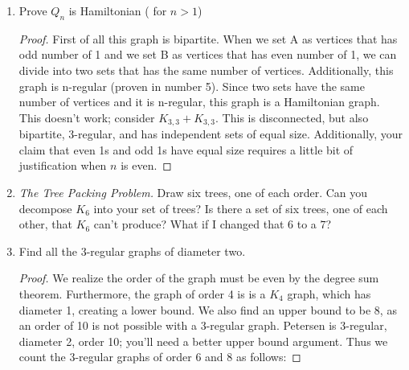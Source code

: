 \begin{enumerate}[leftmargin=*]
\begin{enumerate}
    \item Prove $Q_n$ is regular.
    \begin{proof}
    For each vertices, we can relate with numbers by changing digits 0 to 1 or 1 to 0. Since we can change n tuples, the degree of each vertices are n which makes this graph n-regular. \color{red} Great! \color{black}
\end{proof}
    \item Prove $Q_n$ is bipartite. 
    \begin{proof}
    When we set A as vertices that has odd number of 1 and we set B as vertices that has even number of 1, we can have two set in the same number of vertices and see that this graph is bipartite. \color{red} This works as two independent sets; but this isn't what you've said here. You should be clearer about what these two sets have to do with each other, and why it shows the graph is bipartite. \color{black}
\end{proof}
\end{enumerate}
\item Prove $Q_n$ is Hamiltonian ( for $n > 1$)
\begin{proof}
    First of all this graph is bipartite. When we set A as vertices that has odd number of 1 and we set B as vertices that has even number of 1, we can divide into two sets that has the same number of vertices. Additionally, this graph is n-regular (proven in number 5). Since two sets have the same number of vertices and it is n-regular, this graph is a Hamiltonian graph. \color{red} This doesn't work; consider $K_{3,3} + K_{3,3}.$ This is disconnected, but also bipartite, 3-regular, and has independent sets of equal size. Additionally, your claim that even 1s and odd 1s have equal size requires a little bit of justification when $n$ is even. \color{black}
    
\end{proof}
\item \textit{The Tree Packing Problem. } Draw six trees, one of each order. Can you decompose $K_6$ into your set of trees? Is there a set of six trees, one of each other, that $K_6$ can't produce? What if I changed that $6$ to a $7$? 
\item Find all the $3$-regular graphs of diameter two. 
\begin{proof}
We realize the order of the graph must be even by the degree sum theorem. Furthermore, the graph of order 4 is is a $K_4$ graph, which has diameter 1, creating a lower bound. We also find an upper bound to be 8, as an order of 10 is not possible with a 3-regular graph. \color{red} Petersen is 3-regular, diameter 2, order 10; you'll need a better upper bound argument. \color{black}Thus we count the 3-regular graphs of order 6 and 8 as follows:  


\end{proof}
\end{enumerate}
